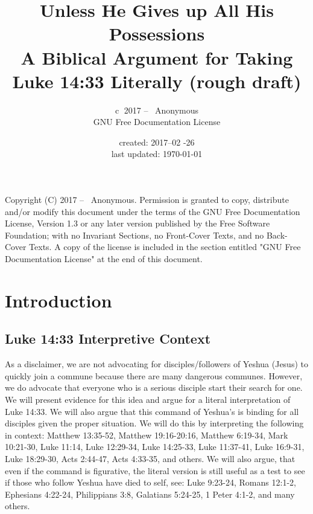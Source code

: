 \documentclass[11pt]{article}
\title{\textbf{Unless He Gives up All His Possessions} \large \\ A Biblical Argument for Taking Luke 14:33 Literally (rough draft) }
\author{\textcircled{c} 2017 -- \the\year \ Anonymous \\ GNU Free Documentation License  }
\date{created: 2017--02 -26 \\ last updated: \today{}}
\begin{document}
\maketitle
\tableofcontents 

\noindent \newline Copyright (C)  2017 -- \the\year \  Anonymous. \newline
Permission is granted to copy, distribute and/or modify this document\newline
under the terms of the GNU Free Documentation License, Version 1.3\newline
or any later version published by the Free Software Foundation;\newline
with no Invariant Sections, no Front-Cover Texts, and no Back-Cover Texts.\newline
A copy of the license is included in the section entitled "GNU\newline
Free Documentation License" at the end of this document.
\section{Introduction}
\subsection{Luke 14:33 Interpretive Context}

As a disclaimer, we are not advocating for disciples/followers of Yeshua (Jesus) to quickly join a commune because there are many dangerous communes. However, we do advocate that everyone who is a serious disciple start their search for one. We will present evidence for this idea and argue for a literal interpretation of Luke 14:33. We will also argue that this command of Yeshua's is binding for all disciples given the proper situation. We will do this by interpreting the following in context: Matthew 13:35-52, Matthew 19:16-20:16, Matthew 6:19-34, Mark 10:21-30, Luke 11:14, Luke 12:29-34, Luke 14:25-33, Luke 11:37-41, Luke 16:9-31, Luke 18:29-30, Acts 2:44-47, Acts 4:33-35, and others. We will also argue, that even if the command is figurative, the literal version is still useful as a test to see if those who follow Yeshua have died to self, see: Luke 9:23-24, Romans 12:1-2, Ephesians 4:22-24, Philippians 3:8, Galatians 5:24-25, 1 Peter 4:1-2, and many others.\cite{death to self verses} 
\end{document}
